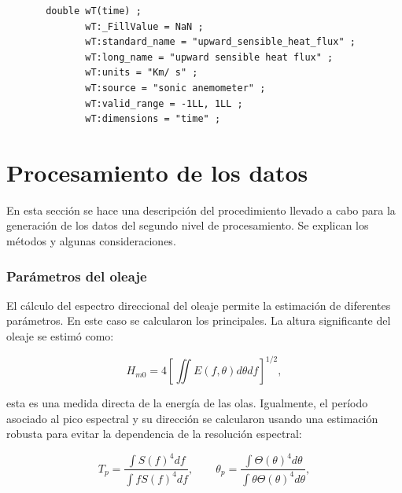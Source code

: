 \documentclass[11pt]{article}
\begin{document}
\begin{verbatim}
       double wT(time) ;
              wT:_FillValue = NaN ;
              wT:standard_name = "upward_sensible_heat_flux" ;
              wT:long_name = "upward sensible heat flux" ;
              wT:units = "Km/ s" ;
              wT:source = "sonic anemometer" ;
              wT:valid_range = -1LL, 1LL ;
              wT:dimensions = "time" ; 
\end{verbatim}







\section{Procesamiento de los datos}
\label{sec:proceamiento_de_los_datos}

En esta sección se hace una descripción del procedimiento llevado a cabo para la
generación de los datos del segundo nivel de procesamiento. Se explican los
métodos y algunas consideraciones.

\subsubsection*{Parámetros del oleaje}%
\label{ssub:parametros_del_oleaje}

El cálculo del espectro direccional del oleaje permite la estimación de
diferentes parámetros. En este caso se calcularon los principales. La altura
significante del oleaje se estimó como:

\begin{equation}
  H_{m0} = 4 \left[ \iint E(f, \theta) d\theta df \right]^{1/2},
\end{equation}

esta es una medida directa de la energía de las olas. Igualmente, el período
asociado al pico espectral y su dirección se calcularon usando una estimación
robusta para evitar la dependencia de la resolución espectral:

\begin{equation}
  T_{p} = \frac{{\displaystyle \int} S(f)^4 df}{{\displaystyle \int} f S(f)^4 df},
  \hspace{2em}
  \theta_{p} = \frac{{\displaystyle \int} \Theta(\theta)^4 d\theta}{{\displaystyle \int}
  \theta \Theta(\theta)^4 d\theta},
\end{equation}
\end{document}
